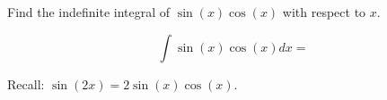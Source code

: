 \documentclass{ximera}
\author{Gregory Hartman \and Matthew Carr\and Nela Lakos}
\begin{document}
\begin{exercise}

Find the indefinite integral of $\sin(x)\cos(x)$ with respect to $x$.

\[
\int \sin(x)\cos(x) dx=
\]
\begin{hint}
Recall: $\sin(2x)=2\sin(x)\cos(x)$.
\end{hint}
\begin{prompt}
\begin{selectAll}

\end{selectAll}

\end{prompt}

\end{exercise}
\end{document}
